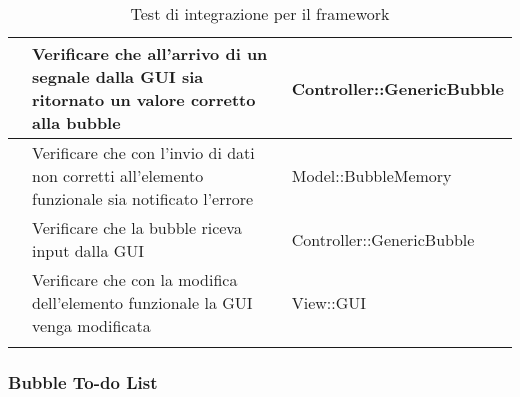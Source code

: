 \begin{longtable}{|c|P{7cm}|P{5cm}|}
	\hline {} & Verificare che all'arrivo di un segnale dalla GUI sia ritornato un valore corretto alla bubble & Controller::GenericBubble \\
	\hline {} & Verificare che con l'invio di dati non corretti all'elemento funzionale sia notificato l'errore & Model::BubbleMemory \\
	\hline {} & Verificare che la bubble riceva input dalla GUI & Controller::GenericBubble \\
	\hline {} & Verificare che con la modifica dell'elemento funzionale la GUI venga modificata & View::GUI \\
	\hline
	\caption{Test di integrazione per il framework}
\end{longtable}

\subsubsection{Bubble To-do List}

